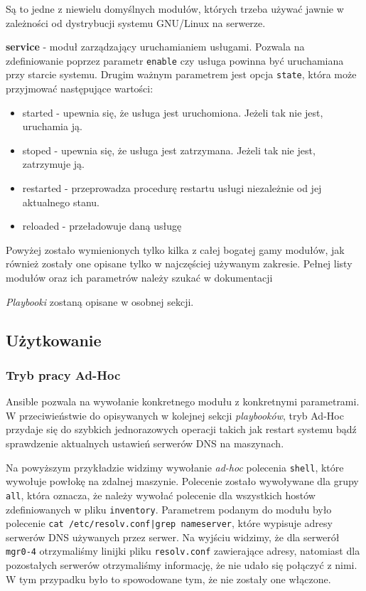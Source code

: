 \begin{description}
\begin{itemize}
				Są to jedne z niewielu domyślnych modułów, których trzeba używać jawnie w zależności od dystrybucji systemu GNU/Linux na serwerze.
		\end{itemize}
	\item{\textbf{service}} - moduł zarządzający uruchamianiem usługami. Pozwala na zdefiniowanie poprzez parametr \texttt{enable} czy usługa powinna być uruchamiana przy starcie systemu.
		Drugim ważnym parametrem jest opcja \texttt{state}, która może przyjmować następujące wartości:
		\begin{itemize}
			\item{started} - upewnia się, że usługa jest uruchomiona. Jeżeli tak nie jest, uruchamia ją.
			\item{stoped} - upewnia się, że usługa jest zatrzymana. Jeżeli tak nie jest, zatrzymuje ją.
			\item{restarted} - przeprowadza procedurę restartu usługi niezależnie od jej aktualnego stanu.
			\item{reloaded} - przeładowuje daną usługę
		\end{itemize}
\end{description}

Powyżej zostało wymienionych tylko kilka z całej bogatej gamy modułów, jak również zostały one opisane tylko w najczęściej używanym zakresie.
Pełnej listy modułów oraz ich parametrów należy szukać w dokumentacji

\textit{Playbooki} zostaną opisane w osobnej sekcji.
\subsection{Użytkowanie}
\subsubsection{Tryb pracy Ad-Hoc}
Ansible pozwala na wywołanie konkretnego modułu z konkretnymi parametrami. W przeciwieństwie do opisywanych w kolejnej sekcji \textit{playbooków}, tryb Ad-Hoc przydaje się do szybkich jednorazowych operacji takich jak restart systemu bądź sprawdzenie aktualnych ustawień serwerów DNS na maszynach.

Na powyższym przykładzie widzimy wywołanie \textit{ad-hoc} polecenia \texttt{shell}, które wywołuje powłokę na zdalnej maszynie.
Polecenie zostało wywoływane dla grupy \texttt{all}, która oznacza, że należy wywołać polecenie dla wszystkich hostów zdefiniowanych w pliku \texttt{inventory}.
Parametrem podanym do modułu było polecenie \texttt{cat /etc/resolv.conf|grep nameserver}, które wypisuje adresy serwerów DNS używanych przez serwer.
Na wyjściu widzimy, że dla serwerół \texttt{mgr0-4} otrzymaliśmy linijki pliku \texttt{resolv.conf} zawierające adresy, natomiast dla pozostałych serwerów otrzymaliśmy informację, że nie udało się połączyć z nimi.
W tym przypadku było to spowodowane tym, że nie zostały one włączone.

